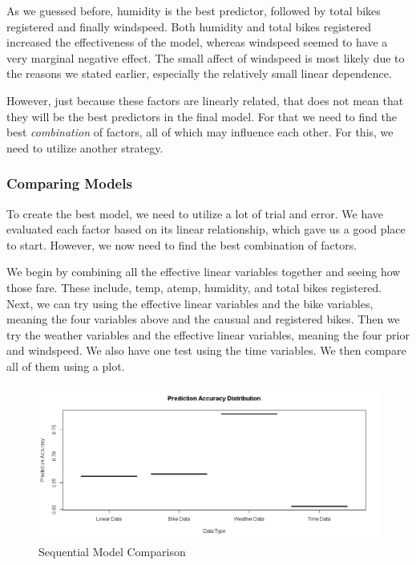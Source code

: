 \documentclass[12pt]{article}
\begin{document}
As we guessed before, humidity is the best predictor, followed by total bikes registered and finally windspeed. Both humidity and total bikes registered increased the effectiveness of the model, whereas windspeed seemed to have a very marginal negative effect. The small affect of windspeed is most likely due to the reasons we stated earlier, especially the relatively small linear dependence. 

However, just because these factors are linearly related, that does not mean that they will be the best predictors in the final model. For that we need to find the best \textit{combination} of factors, all of which may influence each other. For this, we need to utilize another strategy.

\subsubsection{Comparing Models}
To create the best model, we need to utilize a lot of trial and error. We have evaluated each factor based on its linear relationship, which gave us a good place to start. However, we now need to find the best combination of factors.

We begin by combining all the effective linear variables together and seeing how those fare. These include, temp, atemp, humidity, and total bikes registered. Next, we can try using the effective linear variables and the bike variables, meaning the four variables above and the causual and registered bikes. Then we try the weather variables and the effective linear variables, meaning the four prior and windspeed. We also have one test using the time variables. We then compare all of them using a plot.

\begin{figure}[H]
	\centering
  	\includegraphics[width=150mm]{"Sequential Model Comparison"}
 	\caption{Sequential Model Comparison}
 	\label{Sequential Model Comparison}
\end{figure}
\end{document}
